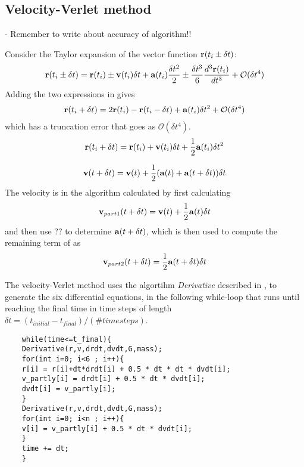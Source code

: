 \subsection{Velocity-Verlet method}
\label{sec:methodVV}
- Remember to write about accuracy of algorithm!!

Consider the Taylor expansion of the vector function $\mbox{\textbf{r}}(t_i \pm \delta t)$:
\begin{align}
	\mbox{\textbf{r}}(t_i \pm \delta t) = \mbox{\textbf{r}}(t_i) \pm \mbox{\textbf{v}} (t_i) \delta t
	+ \mbox{\textbf{a}} (t_i) \frac{\delta t ^2}{2}  \pm \frac{\delta t ^3}{6} \frac{d^3 \mbox{\textbf{r}}(t_i)}{dt^3} + \mathcal{O}(\delta t ^4 )
	\label{eq:TaylorExpVVmethod}
\end{align}
Adding the two expressions in  gives
\begin{align}
	\mbox{\textbf{r}} (t_i +\delta t) = 2\mbox{\textbf{r}} (t_i) - \mbox{\textbf{r}} (t_i -\delta t)  + \mbox{\textbf{a}} (t_i ) \delta t^2 + \mathcal{O} (\delta t ^4 )
\end{align}
which has a truncation error that goes as $\mathcal{O} (\delta t ^4 )$.
\begin{align}
	\mbox{\textbf{r}}(t_i+\delta t) = \mbox{\textbf{r}}(t_i) + \mbox{\textbf{v}} (t_i) \delta t + \frac{1}{2} \mbox{\textbf{a}} (t_i) \delta t^2 
	\label{eq:VVmethodNextPosition}
\end{align}

\begin{align}
	\mbox{\textbf{v}} (t + \delta t) = \mbox{\textbf{v}} (t) + \frac{1}{2} ( \mbox{\textbf{a}} (t) + \mbox{\textbf{a}} (t + \delta t) ) \delta t
	\label{eq:VVmethodNextVelocity}
\end{align}
The velocity is in the algorithm calculated  by first calculating 
\begin{align}
	\mbox{\textbf{v}}_{part1} (t + \delta t) = \mbox{\textbf{v}} (t) + \frac{1}{2}  \mbox{\textbf{a}} (t)  \delta t
	\label{eq:VVmethodNextVelocityPart1}
\end{align}
and then use ??  to determine $\mbox{\textbf{a}} (t + \delta t)$, which is then used to compute the remaining term of  as 
\begin{align}
	\mbox{\textbf{v}}_{part2} (t + \delta t) = \frac{1}{2} \mbox{\textbf{a}} (t + \delta t) \delta t
	\label{eq:VVmethodNextVelocityPart2}
\end{align}

The velocity-Verlet method uses the algortihm \textit{Derivative} described in , to generate the six differential equations, in the following while-loop that runs until reaching the final time in time steps of length $\delta t = (t_{initial} - t_{final})/(\# time steps)$.
\begin{lstlisting}
    while(time<=t_final){
    Derivative(r,v,drdt,dvdt,G,mass);
    for(int i=0; i<6 ; i++){
    r[i] = r[i]+dt*drdt[i] + 0.5 * dt * dt * dvdt[i];
    v_partly[i] = drdt[i] + 0.5 * dt * dvdt[i];
    dvdt[i] = v_partly[i];
    }
    Derivative(r,v,drdt,dvdt,G,mass);
    for(int i=0; i<n ; i++){
    v[i] = v_partly[i] + 0.5 * dt * dvdt[i];
    }
    time += dt;
    }
\end{lstlisting}